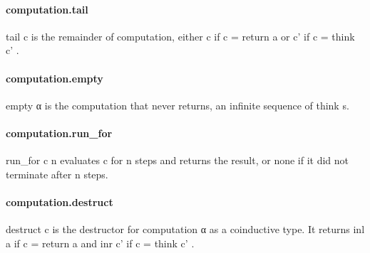 \documentclass{article}
\begin{document}
\paragraph{computation.tail}
\par
\colorbox[RGB]{253,246,227}{{{{\color[RGB]{101, 123, 131} tail c }}}} is the remainder of computation, either 
\colorbox[RGB]{253,246,227}{{{{\color[RGB]{101, 123, 131} c }}}} if 
\colorbox[RGB]{253,246,227}{{{{\color[RGB]{101, 123, 131} c  }}}{{{\color[RGB]{181, 137, 0} = }}}{{{\color[RGB]{101, 123, 131}  return a }}}}or 
\colorbox[RGB]{253,246,227}{{{{\color[RGB]{101, 123, 131} c' }}}} if 
\colorbox[RGB]{253,246,227}{{{{\color[RGB]{101, 123, 131} c  }}}{{{\color[RGB]{181, 137, 0} = }}}{{{\color[RGB]{101, 123, 131}  think c' }}}}.
\paragraph{computation.empty}
\par
\colorbox[RGB]{253,246,227}{{{{\color[RGB]{101, 123, 131} empty α }}}} is the computation that never returns, an infinite sequence of
\colorbox[RGB]{253,246,227}{{{{\color[RGB]{101, 123, 131} think }}}}s.
\paragraph{computation.run\_for}
\par
\colorbox[RGB]{253,246,227}{{{{\color[RGB]{101, 123, 131} run\_for c n }}}} evaluates 
\colorbox[RGB]{253,246,227}{{{{\color[RGB]{101, 123, 131} c }}}} for 
\colorbox[RGB]{253,246,227}{{{{\color[RGB]{101, 123, 131} n }}}} steps and returns the result, or 
\colorbox[RGB]{253,246,227}{{{{\color[RGB]{101, 123, 131} none }}}}if it did not terminate after 
\colorbox[RGB]{253,246,227}{{{{\color[RGB]{101, 123, 131} n }}}} steps.
\paragraph{computation.destruct}
\par
\colorbox[RGB]{253,246,227}{{{{\color[RGB]{101, 123, 131} destruct c }}}} is the destructor for 
\colorbox[RGB]{253,246,227}{{{{\color[RGB]{101, 123, 131} computation α }}}} as a coinductive type.
It returns 
\colorbox[RGB]{253,246,227}{{{{\color[RGB]{101, 123, 131} inl a }}}} if 
\colorbox[RGB]{253,246,227}{{{{\color[RGB]{101, 123, 131} c  }}}{{{\color[RGB]{181, 137, 0} = }}}{{{\color[RGB]{101, 123, 131}  return a }}}} and 
\colorbox[RGB]{253,246,227}{{{{\color[RGB]{101, 123, 131} inr c' }}}} if 
\colorbox[RGB]{253,246,227}{{{{\color[RGB]{101, 123, 131} c  }}}{{{\color[RGB]{181, 137, 0} = }}}{{{\color[RGB]{101, 123, 131}  think c' }}}}.
\end{document}
